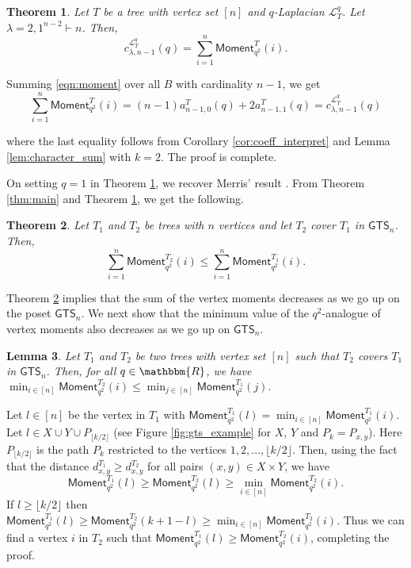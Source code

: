 \documentclass[12pt]{article}
\def\eod{\vrule height 6pt width 5pt depth 0pt}
\newenvironment{proof}{\noindent {\bf Proof:} \hspace{.2em}}
                      {\hspace*{\fill}{\eod}}
\newtheorem{theorem}{Theorem}
\newtheorem{lemma}[theorem]{Lemma}
\newcommand{\sL}{  \mathcal{ L}}
\newcommand{\ssM}{  \mathsf{Moment}}
\newcommand{\RR}{ \mathbbm{R}}
\newcommand{\GTS}{\mathsf{GTS}}
\begin{document}
\begin{theorem}
  \label{thm:algebr_inv}
Let $T$ be a tree with vertex set $[n]$  and  $q$-Laplacian $\sL_T^q$. 
Let $\lambda=2,1^{n-2}\vdash n$. Then, 
$$c_{\lambda,n-1}^{\sL_T^q}(q)=\sum\limits_{i=1}^{n} \ssM_{q^2}^T(i).$$
\end{theorem}

\begin{proof}
Summing \eqref{eqn:moment} over all $B$ with cardinality $n-1$, we get 
\begin{equation*}
\sum\limits_{i=1}^{n} \ssM_{q^2}^T(i)  = (n-1)a_{n-1,0}^T(q) + 2 a_{n-1,1}^T(q) 
  =  c_{\lambda,n-1}^{\sL_T^q}(q)
\end{equation*}

where the last equality follows from Corollary \ref{cor:coeff_interpret} 
and Lemma \ref{lem:character_sum} with $k=2$.  The proof is complete.
\end{proof}
 

On setting $q=1$ in Theorem \ref{thm:algebr_inv}, we recover
Merris' result \cite[Theorem 6]{merris-second-imm-polynom}.
From Theorem \ref{thm:main} and Theorem \ref{thm:algebr_inv}, 
we get the following.

\begin{theorem}
\label{thm:moment_gts}
Let $T_1$ and $T_2$ be trees with $n$ vertices and let $T_2$ cover $T_1$ in $\GTS_n$.  
Then, $$ \sum\limits_{i=1}^{n} \ssM_{q^2}^{T_2}(i)  \leq \sum\limits_{i=1}^{n} \ssM_{q^2}^{T_1}(i).$$
\end{theorem}

Theorem \ref{thm:moment_gts} implies that the sum of
the vertex moments decreases as we go up on the poset $\GTS_n$.  
We next show that the minimum value of the $q^2$-analogue of 
vertex moments also decreases as we go up on $\GTS_n$. 


\begin{lemma}
\label{lem:min_moment}
Let $T_1$ and $T_2$ be two trees with vertex set $[n]$ such that  $T_2$ covers  $T_1$ in ${\GTS_n}$.  
Then, for all $q\in \RR$, 
we have $\min_{i\in [n]} \ssM_{q^2}^{T_2}(i)\leq \min_{j\in [n]} \ssM_{q^2}^{T_1}(j).$ 
\end{lemma}
\begin{proof} 
Let $l\in [n]$ be the vertex in $T_1$ with  
$\ssM_{q^2}^{T_1}(l)=\min_{i\in [n]} \ssM_{q^2}^{T_1}(i)$. Let
$l\in X\cup Y\cup P_{\lfloor k / 2\rfloor}$ (see Figure 
\ref{fig:gts_example} for $X$,  $Y$ and $P_k=P_{x,y}$).
Here $P_{\lfloor k/2 \rfloor}$ is the path $P_k$ restricted
to the vertices $1,2,\ldots, \lfloor k/2 \rfloor$.
Then, using 
the fact that the distance $d^{T_1}_{x,y}  \geq d^{T_2}_{x,y}$ 
for all pairs  $(x,y)\in X\times Y$, we have  
$$\ssM_{q^2}^{T_1}(l)\geq \ssM_{q^2}^{T_2}(l)\geq \min_{i\in [n]} \ssM_{q^2}^{T_2}(i).$$
If $l\geq \lfloor k / 2\rfloor$ then  
$\ssM_{q^2}^{T_1}(l)\geq \ssM_{q^2}^{T_2}(k+1-l)\geq \min_{i\in [n]} \ssM_{q^2}^{T_2}(i).$ 
Thus we can find a vertex $i$ in $T_2$ such that 
$\ssM_{q^2}^{T_1}(l)\geq \ssM_{q^2}^{T_2}(i)$, completing the proof. 
\end{proof}
\end{document}
